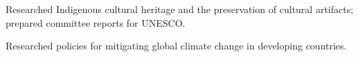 \begin{details}
    \item Researched Indigenous cultural heritage and the preservation of cultural artifacts; prepared committee reports for UNESCO.
\end{details}

\begin{details}
    \item Researched policies for mitigating global climate change in developing countries.
\end{details}
